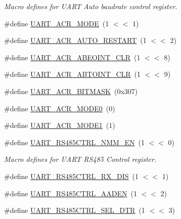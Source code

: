 \begin{DoxyCompactItemize}
\begin{DoxyCompactList}\small\item\em Macro defines for U\+A\+RT Auto baudrate control register. \end{DoxyCompactList}\item 
\#define \hyperlink{group___u_a_r_t__18_x_x__43_x_x_ga706e927ee7abf7027eb88b1e13dd2a92}{U\+A\+R\+T\+\_\+\+A\+C\+R\+\_\+\+M\+O\+DE}~(1 $<$$<$ 1)
\item 
\#define \hyperlink{group___u_a_r_t__18_x_x__43_x_x_ga20674ae8e687d2161ef3fd88f2649036}{U\+A\+R\+T\+\_\+\+A\+C\+R\+\_\+\+A\+U\+T\+O\+\_\+\+R\+E\+S\+T\+A\+RT}~(1 $<$$<$ 2)
\item 
\#define \hyperlink{group___u_a_r_t__18_x_x__43_x_x_ga77450ebf0f86b6b7ea363927f0cd40c2}{U\+A\+R\+T\+\_\+\+A\+C\+R\+\_\+\+A\+B\+E\+O\+I\+N\+T\+\_\+\+C\+LR}~(1 $<$$<$ 8)
\item 
\#define \hyperlink{group___u_a_r_t__18_x_x__43_x_x_ga2e12222f359d7a5a41668cd729b0731d}{U\+A\+R\+T\+\_\+\+A\+C\+R\+\_\+\+A\+B\+T\+O\+I\+N\+T\+\_\+\+C\+LR}~(1 $<$$<$ 9)
\item 
\#define \hyperlink{group___u_a_r_t__18_x_x__43_x_x_gae83190d58b42771ee951dfe88aada715}{U\+A\+R\+T\+\_\+\+A\+C\+R\+\_\+\+B\+I\+T\+M\+A\+SK}~(0x307)
\item 
\#define \hyperlink{group___u_a_r_t__18_x_x__43_x_x_ga31933a99dfe9a8afac45c1f26b0cf021}{U\+A\+R\+T\+\_\+\+A\+C\+R\+\_\+\+M\+O\+D\+E0}~(0)
\item 
\#define \hyperlink{group___u_a_r_t__18_x_x__43_x_x_ga25d690e49a3ccc696e031e8a1480dc1d}{U\+A\+R\+T\+\_\+\+A\+C\+R\+\_\+\+M\+O\+D\+E1}~(1)
\item 
\#define \hyperlink{group___u_a_r_t__18_x_x__43_x_x_ga0b5e5ccc3ad07acad2bfa3f0846cbfd0}{U\+A\+R\+T\+\_\+\+R\+S485\+C\+T\+R\+L\+\_\+\+N\+M\+M\+\_\+\+EN}~(1 $<$$<$ 0)
\begin{DoxyCompactList}\small\item\em Macro defines for U\+A\+RT R\+S485 Control register. \end{DoxyCompactList}\item 
\#define \hyperlink{group___u_a_r_t__18_x_x__43_x_x_gacdaee14296a914ca14d877069414f88f}{U\+A\+R\+T\+\_\+\+R\+S485\+C\+T\+R\+L\+\_\+\+R\+X\+\_\+\+D\+IS}~(1 $<$$<$ 1)
\item 
\#define \hyperlink{group___u_a_r_t__18_x_x__43_x_x_ga1e4adf900200efcdfaab657b180b30d1}{U\+A\+R\+T\+\_\+\+R\+S485\+C\+T\+R\+L\+\_\+\+A\+A\+D\+EN}~(1 $<$$<$ 2)
\item 
\#define \hyperlink{group___u_a_r_t__18_x_x__43_x_x_ga0632053088b7e65c6000274a90a76091}{U\+A\+R\+T\+\_\+\+R\+S485\+C\+T\+R\+L\+\_\+\+S\+E\+L\+\_\+\+D\+TR}~(1 $<$$<$ 3)

\end{DoxyCompactItemize}
